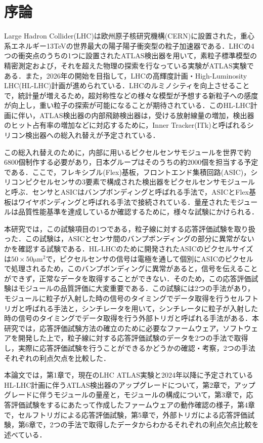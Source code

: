 \chapter*{序論}
Large Hadron Collider(LHC)は欧州原子核研究機構(CERN)に設置された，重心系エネルギー13TeVの世界最大の陽子陽子衝突型の粒子加速器である．LHCの4つの衝突点のうちの1つに設置されたATLAS検出器を用いて，素粒子標準模型の精密測定および，それを超えた物理の探索を行なっている実験がATLAS実験である．また，2026年の開始を目指して，LHCの高輝度計画・High-Luminosity LHC(HL-LHC)計画が進められている．LHCのルミノシティを向上させることで，統計量が増えるため，超対称性などの様々な模型が予想する新粒子への感度が向上し，重い粒子の探索が可能になることが期待されている．このHL-LHC計画に伴い，ATLAS検出器の内部飛跡検出器は，受ける放射線量の増加，検出器のヒット占有率の増加などに対応するために，Inner Tracker(ITk)と呼ばれるシリコン検出器への総入れ替えが予定されている．\par
この総入れ替えのために，内部に用いるピクセルセンサモジュールを世界で約6800個制作する必要があり，日本グループはそのうちの約2000個を担当する予定である．ここで，フレキシブル(Flex)基板，フロントエンド集積回路(ASIC)，シリコンピクセルセンサの3要素で構成された検出器をピクセルセンサモジュールと呼ぶ．センサとASICはバンプボンディングと呼ばれる手法で，ASICとFlex基板はワイヤボンディングと呼ばれる手法で接続されている．量産されたモジュールは品質性能基準を達成しているか確認するために，様々な試験にかけられる．\par
本研究では，この試験項目の1つである，粒子線に対する応答評価試験を取り扱った．この試験は，ASICとセンサ間のバンプボンディングの部分に異常がないかを確認する試験である．HL-LHCのために開発されたASICのピクセルサイズは$50\times50 \mathrm{\mu m^2}$で，ピクセルセンサの信号は電極を通して個別にASICのピクセルで処理されるため，このバンプボンディングに異常があると，信号を伝えることができず，正常なデータを取得することができない．そのため，この応答評価試験はモジュールの品質評価に大変重要である．この試験には2つの手法があり，モジュールに粒子が入射した時の信号のタイミングでデータ取得を行うセルフトリガと呼ばれる手法と，シンチレータを用いて，シンチレータに粒子が入射した時の信号のタイミングでデータ取得を行う外部トリガと呼ばれる手法がある．本研究では，応答評価試験方法の確立のために必要なファームウェア，ソフトウェアを開発した上で，粒子線に対する応答評価試験のデータを2つの手法で取得し，実際に応答評価試験を行うことができるかどうかの確認・考察，2つの手法それぞれの利点欠点を比較した．\par
本論文では，第1章で，現在のLHC ATLAS実験と2024年以降に予定されているHL-LHC計画に伴うATLAS検出器のアップグレードについて，第2章で，アップグレードに伴うモジュールの量産と，モジュールの構成について，第3章で，応答評価試験をするにあたって作成したファームウェアの動作確認の様子，第4章で，セルフトリガによる応答評価試験，第5章で，外部トリガによる応答評価試験，第6章で，2つの手法で取得したデータからわかるそれぞれの利点欠点比較を述べている．
